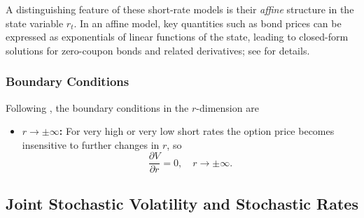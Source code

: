 \documentclass[12pt]{report} %
\theoremstyle{plain}           %
\theoremstyle{definition}      %
\theoremstyle{remark}          %
\begin{document}
A distinguishing feature of these short-rate models is their \emph{affine} structure in the state
variable \(r_t\).  In an affine model, key quantities such as bond prices can be expressed as
exponentials of linear functions of the state, leading to closed-form solutions for
zero-coupon bonds and related derivatives; see \cite{brigo2013interest} for details.

\subsubsection{Boundary Conditions}

Following \cite{duffy2022numerical}, the boundary conditions in the \(r\)-dimension are

\begin{itemize}
  \item \textbf{\(r\to\pm\infty\):}  
        For very high or very low short rates the option price becomes insensitive to further
        changes in \(r\), so
        \[
          \frac{\partial V}{\partial r} = 0,
          \quad
          r\to\pm\infty.
        \]
\end{itemize}


\subsection{Joint Stochastic Volatility and Stochastic Rates}\label{sec:sv_rates}
\end{document}
